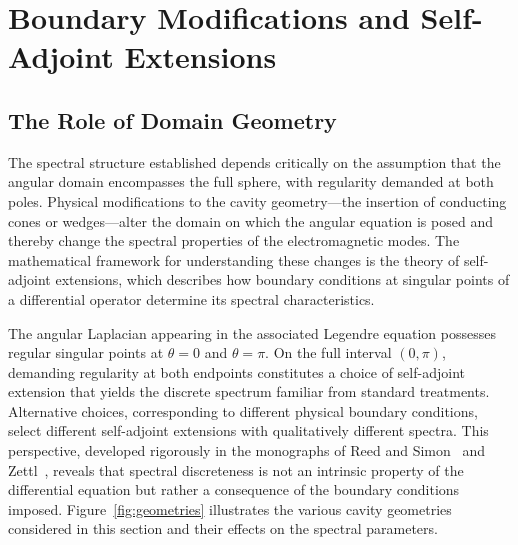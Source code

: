 \documentclass[
  aip,
  amsmath,amssymb,
  preprint
]{revtex4-1}
\begin{document}
\section{Boundary Modifications and Self-Adjoint Extensions}
\label{boundary}
\subsection{The Role of Domain Geometry}
The spectral structure established depends critically on the assumption that the angular domain encompasses the full sphere, with regularity demanded at both poles. Physical modifications to the cavity geometry---the insertion of conducting cones or wedges---alter the domain on which the angular equation is posed and thereby change the spectral properties of the electromagnetic modes. The mathematical framework for understanding these changes is the theory of self-adjoint extensions, which describes how boundary conditions at singular points of a differential operator determine its spectral characteristics.

The angular Laplacian appearing in the associated Legendre equation possesses regular singular points at $\theta = 0$ and $\theta = \pi$. On the full interval $(0, \pi)$, demanding regularity at both endpoints constitutes a choice of self-adjoint extension that yields the discrete spectrum familiar from standard treatments. Alternative choices, corresponding to different physical boundary conditions, select different self-adjoint extensions with qualitatively different spectra. This perspective, developed rigorously in the monographs of Reed and Simon~\cite{ReedSimon1975} and Zettl~\cite{Zettl2005}, reveals that spectral discreteness is not an intrinsic property of the differential equation but rather a consequence of the boundary conditions imposed. Figure~\ref{fig:geometries} illustrates the various cavity geometries considered in this section and their effects on the spectral parameters.
\end{document}
